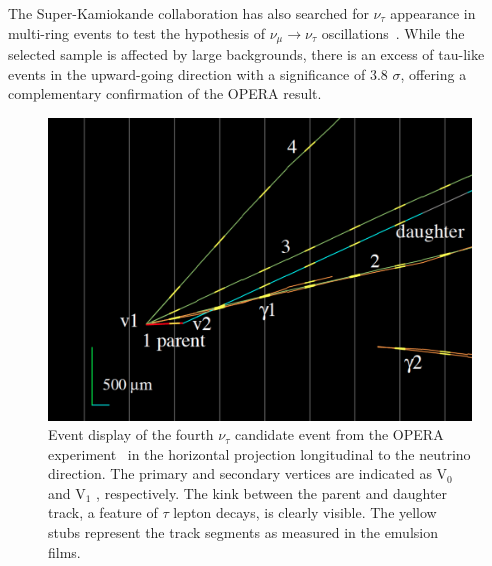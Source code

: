 The Super-Kamiokande collaboration has also searched for $\nu_\tau$ appearance in multi-ring events to test the hypothesis of $\nu_\mu \rightarrow \nu_\tau$ oscillations~\cite{Abe:2012jj}. While the selected sample is affected by large backgrounds, there is an excess of tau-like events in the upward-going direction with a significance of 3.8 $\sigma$, offering a complementary confirmation of the OPERA result.  
 
\begin{figure}[htbp]
\centering
\includegraphics[width=0.6\linewidth]{figures/tau4.pdf}
  \caption{
Event display of the fourth $\nu_\tau$ candidate event from the OPERA 
experiment~\cite{DICRESCENZO2015186} in the
horizontal projection longitudinal to the neutrino direction.
The primary and secondary vertices are indicated as V$_0$ and
V$_1$ , respectively. The kink between the parent and daughter track, a feature of $\tau$ lepton decays, is clearly visible. The yellow stubs represent the track segments as measured in the emulsion films.  
}
 \label{fig:opera}
 \end{figure}

